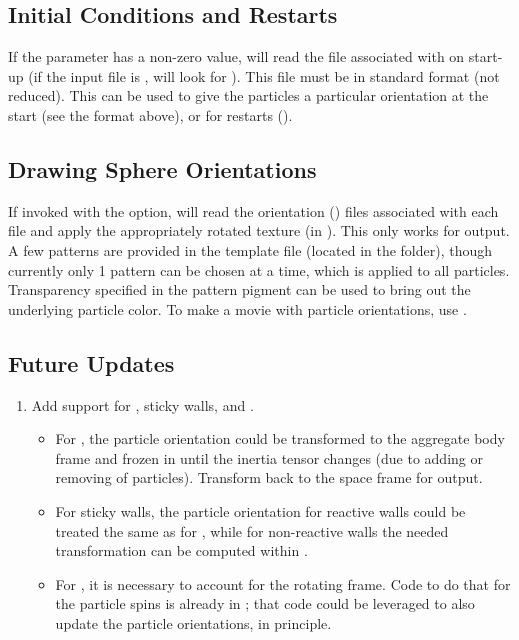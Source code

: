 \subsection{Initial Conditions and Restarts}

If the  parameter has a non-zero value,
 will read the  file associated with
 on start-up (\eg if the input file is
,  will look for ).
This file must be in standard format (not reduced).  This can be used
to give the particles a particular orientation at the start (see the
format above), or for restarts ().

\subsection{Drawing Sphere Orientations}

If invoked with the  option,  will read the
orientation () files associated with each  file
and apply the appropriately rotated  texture (in
).  This only works for  output.  A few
patterns are provided in the template  file (located
in the   folder), though currently only 1
pattern can be chosen at a time, which is applied to all particles.
Transparency specified in the pattern pigment can be used to bring out
the underlying particle color.  To make a movie with particle
orientations, use .

\subsection{Future Updates}

\begin{enumerate}
\item Add support for , sticky walls, and
  .
  \begin{itemize}
  \item For , the particle orientation could be transformed
    to the aggregate body frame and frozen in until the inertia tensor
    changes (due to adding or removing of particles). Transform back
    to the space frame for output.
  \item For sticky walls, the particle orientation for reactive walls
    could be treated the same as for , while for
    non-reactive walls the needed transformation can be computed
    within .
  \item For , it is necessary to account for the
    rotating frame. Code to do that for the particle spins is already
    in ; that code could be leveraged to also update the
    particle orientations, in principle.
  \end{itemize}
\end{enumerate}
  

